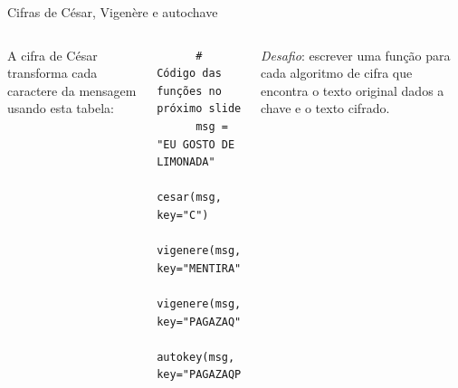 \documentclass[utf8]{beamer}
\begin{document}
\begin{frame}[fragile]{Cifras de César, Vigenère e autochave}
\begin{columns}[c]
    A cifra de César transforma cada caractere da mensagem
    usando esta tabela:
    \vspace{.5em}\vfill
    \vfill
    \begin{verbatim}
      # Código das funções no próximo slide
      msg = "EU GOSTO DE LIMONADA"
      cesar(msg, key="C")
      vigenere(msg, key="MENTIRA")
      vigenere(msg, key="PAGAZAQ")
      autokey(msg, key="PAGAZAQP")
    \end{verbatim}
    \vfill
    \emph{Desafio}: escrever uma função para cada algoritmo de cifra
                    que encontra o texto original
                    dados a chave e o texto cifrado.
  \end{columns}
\end{frame}
\end{document}
